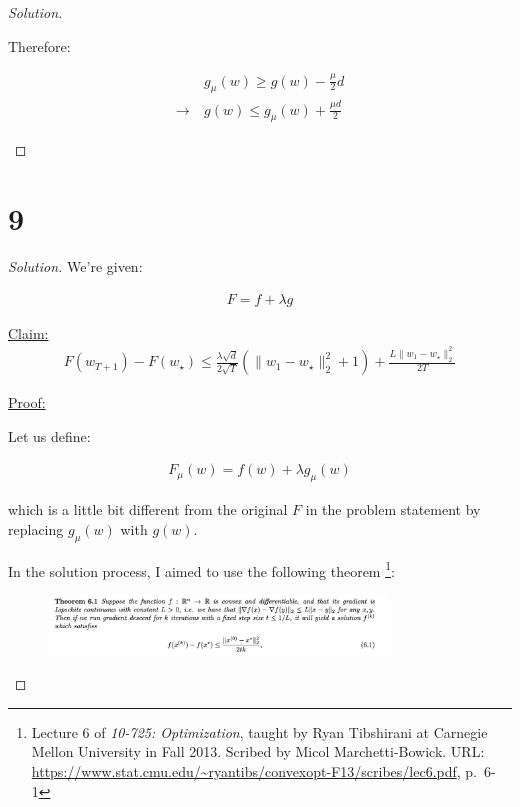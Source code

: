\documentclass{article}
\newenvironment{solution}
  {\renewcommand\qedsymbol{$\blacksquare$}\begin{proof}[Solution]}
  {\end{proof}}
\newenvironment{claim}[1]{\par\noindent\underline{Claim:}\space#1}{}
\newenvironment{claimproof}[1]{\par\noindent\underline{Proof:}\space#1}{}
\begin{document}
\begin{solution}
\begin{itemize}
        Therefore:

        \begin{align*}
            & g_\mu(w) \geq g(w) - \frac{\mu}{2} d \\
            \rightarrow \ & g(w) \leq g_\mu(w) + \frac{\mu d}{2}
        \end{align*}
    \end{itemize}
\end{solution}

\section*{9}

\begin{solution}

    We're given:

    \begin{align*}
        F = f + \lambda g
    \end{align*}

    \begin{claim}
        \begin{align*}
            F(w_{T+1}) - F(w_\star) 
            \leq 
            \frac{\lambda \sqrt{d}}{2 \sqrt{T}} \left( \| w_1 - w_\star \|_2^2 + 1 \right) + \frac{ L \|w_1 - w_\star\|_2^2}{2T}
        \end{align*}
    \end{claim}

    \begin{claimproof}
        \bigskip

        Let us define:

        \begin{align*}
            F_\mu(w) = f(w) + \lambda g_\mu(w)
        \end{align*}

        which is a little bit different from the original $F$ in the problem statement by replacing $g_\mu(w)$ with $g(w)$.
        \bigskip

        In the solution process, I aimed to use the following theorem
        \footnote{Lecture 6 of \textit{10-725: Optimization}, taught by Ryan Tibshirani at Carnegie Mellon University in Fall 2013. Scribed by Micol Marchetti-Bowick. URL: \url{https://www.stat.cmu.edu/~ryantibs/convexopt-F13/scribes/lec6.pdf}, p.~6-1}:

        \begin{figure}[H]
            \centering
            \includegraphics[width = 0.8\textwidth]{gradient_descent_convergence.png}
        \end{figure}


\end{claimproof}
\end{solution}
\end{document}

